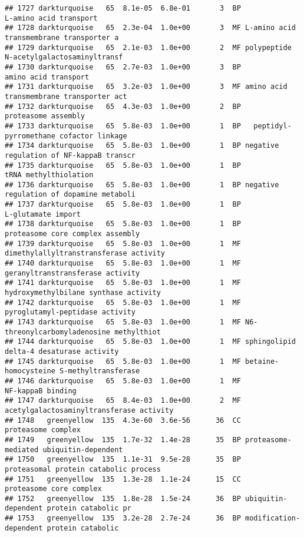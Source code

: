 \documentclass[]{article}
\begin{document}
\begin{verbatim}
## 1727 darkturquoise   65  8.1e-05  6.8e-01       3  BP                   L-amino acid transport
## 1728 darkturquoise   65  2.3e-04  1.0e+00       3  MF L-amino acid transmembrane transporter a
## 1729 darkturquoise   65  2.1e-03  1.0e+00       2  MF polypeptide N-acetylgalactosaminyltransf
## 1730 darkturquoise   65  2.7e-03  1.0e+00       3  BP                     amino acid transport
## 1731 darkturquoise   65  3.2e-03  1.0e+00       3  MF amino acid transmembrane transporter act
## 1732 darkturquoise   65  4.3e-03  1.0e+00       2  BP                      proteasome assembly
## 1733 darkturquoise   65  5.8e-03  1.0e+00       1  BP   peptidyl-pyrromethane cofactor linkage
## 1734 darkturquoise   65  5.8e-03  1.0e+00       1  BP negative regulation of NF-kappaB transcr
## 1735 darkturquoise   65  5.8e-03  1.0e+00       1  BP                    tRNA methylthiolation
## 1736 darkturquoise   65  5.8e-03  1.0e+00       1  BP negative regulation of dopamine metaboli
## 1737 darkturquoise   65  5.8e-03  1.0e+00       1  BP                       L-glutamate import
## 1738 darkturquoise   65  5.8e-03  1.0e+00       1  BP         proteasome core complex assembly
## 1739 darkturquoise   65  5.8e-03  1.0e+00       1  MF   dimethylallyltranstransferase activity
## 1740 darkturquoise   65  5.8e-03  1.0e+00       1  MF         geranyltranstransferase activity
## 1741 darkturquoise   65  5.8e-03  1.0e+00       1  MF    hydroxymethylbilane synthase activity
## 1742 darkturquoise   65  5.8e-03  1.0e+00       1  MF          pyroglutamyl-peptidase activity
## 1743 darkturquoise   65  5.8e-03  1.0e+00       1  MF N6-threonylcarbomyladenosine methylthiot
## 1744 darkturquoise   65  5.8e-03  1.0e+00       1  MF sphingolipid delta-4 desaturase activity
## 1745 darkturquoise   65  5.8e-03  1.0e+00       1  MF betaine-homocysteine S-methyltransferase
## 1746 darkturquoise   65  5.8e-03  1.0e+00       1  MF                        NF-kappaB binding
## 1747 darkturquoise   65  8.4e-03  1.0e+00       2  MF acetylgalactosaminyltransferase activity
## 1748   greenyellow  135  4.3e-60  3.6e-56      36  CC                       proteasome complex
## 1749   greenyellow  135  1.7e-32  1.4e-28      35  BP proteasome-mediated ubiquitin-dependent 
## 1750   greenyellow  135  1.1e-31  9.5e-28      35  BP    proteasomal protein catabolic process
## 1751   greenyellow  135  1.3e-28  1.1e-24      15  CC                  proteasome core complex
## 1752   greenyellow  135  1.8e-28  1.5e-24      36  BP ubiquitin-dependent protein catabolic pr
## 1753   greenyellow  135  3.2e-28  2.7e-24      36  BP modification-dependent protein catabolic

\end{verbatim}
\end{document}
